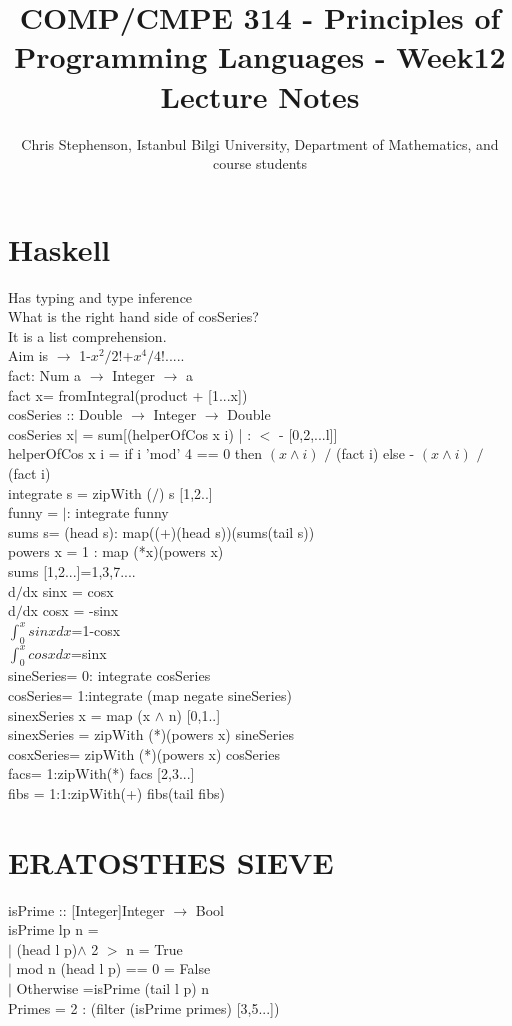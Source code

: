 \documentclass{article}
\begin{document}
\title{COMP/CMPE 314 - Principles of Programming Languages - Week12 Lecture Notes}
\author{Chris Stephenson, Istanbul Bilgi University, Department of Mathematics, and course students}
\section {Haskell} 

Has typing and type inference\\
What is the right hand side of cosSeries?\\
It is a list comprehension.\\
Aim is $\rightarrow$ 1-$x^2/2!$+$x^4/4!$.....\\
fact: Num a $\rightarrow$ Integer $\rightarrow$ a \\
fact x= fromIntegral(product + [1...x])\\
cosSeries :: Double $\rightarrow$ Integer $\rightarrow$ Double \\
cosSeries x$\mid$ = sum[(helperOfCos x i) | : $<$ - [0,2,...l]] \\
helperOfCos x i = if i 'mod' 4 == 0 then $(x\wedge i)$ $/$ (fact i) else - $(x\wedge i)$ $/$ (fact i) \\
integrate s = zipWith ($/$) s [1,2..] \\
funny = $|$: integrate funny \\
sums s= (head s): map((+)(head s))(sums(tail s)) \\
powers x = 1 : map (*x)(powers x) \\
sums [1,2...]=1,3,7.... \\
d$/$dx sinx = cosx \\
d$/$dx cosx = -sinx \\
$\int_{0}^{x} sinx dx$=1-cosx \\
$\int_{0}^{x} cosx dx$=sinx \\
sineSeries= 0: integrate cosSeries \\
cosSeries= 1:integrate (map negate sineSeries) \\
sinexSeries x = map (x $\wedge$ n) [0,1..] \\
sinexSeries = zipWith (*)(powers x) sineSeries \\
cosxSeries= zipWith (*)(powers x) cosSeries \\
facs= 1:zipWith(*) facs [2,3...] \\
fibs = 1:1:zipWith(+) fibs(tail fibs) \\
\section {ERATOSTHES SIEVE} 
isPrime :: [Integer]Integer $\rightarrow$ Bool \\
isPrime lp n = \\ 
$|$ (head l p)$\wedge$ 2 $>$ n = True\\
$|$ mod n (head l p) == 0 = False\\
$|$ Otherwise =isPrime (tail l p) n \\
Primes = 2 : (filter (isPrime primes) [3,5...]) \\
\end{document}

